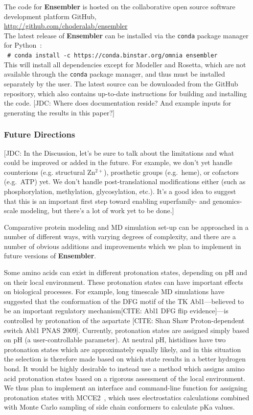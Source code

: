 \documentclass[aps,pre,twocolumn,nofootinbib,superscriptaddress,linenumbers]{revtex4-1}
\newcommand{\shellcmd}[1]{\\\ \texttt{\scriptsize\# #1}\\}
\begin{document}
The code for {\bf Ensembler} is hosted on the collaborative open source software development platform GitHub,\\
\url{http://github.com/choderalab/ensembler} \\
The latest release of {\bf Ensembler} can be installed via the {\tt conda} package manager for Python~\cite{conda}:
\shellcmd{conda install -c https://conda.binstar.org/omnia ensembler}
This will install all dependencies except for Modeller and Rosetta, which are not available through the {\tt conda} package manager, and thus must be installed separately by the user.
The latest source can be downloaded from the GitHub repository, which also contains up-to-date instructions for building and installing the code.
{\color{red}[JDC: Where does documentation reside?  And example inputs for generating the results in this paper?]}

\subsubsection*{Future Directions}

{\color{red}[JDC: In the Discussion, let's be sure to talk about the limitations and what could be improved or added in the future.  For example, we don't yet handle counterions (e.g. structural Zn$^{2+}$), prosthetic groups (e.g.~heme), or cofactors (e.g.~ATP) yet.  We don't handle post-translational modifications either (such as phosphorylation, methylation, glycosylation, etc.).  It's a good idea to suggest that this is an important first step toward enabling superfamily- and genomics-scale modeling, but there's a lot of work yet to be done.]}

Comparative protein modeling and MD simulation set-up can be approached in a number of different ways, with varying degrees of complexity, and there are a number of obvious additions and improvements which we plan to implement in future versions of {\bf Ensembler}.

Some amino acids can exist in different protonation states, depending on pH and on their local environment.
These protonation states can have important effects on biological processes.
For example, long timescale MD simulations have suggested that the conformation of the DFG motif of the TK Abl1---believed to be an important regulatory mechanism[CITE: Abl1 DFG flip evidence]---is controlled by protonation of the aspartate [CITE: Shan Shaw Proton-dependent switch Abl1 PNAS 2009].
Currently, protonation states are assigned simply based on pH (a user-controllable parameter).
At neutral pH, histidines have two protonation states which are approximately equally likely, and in this situation the selection is therefore made based on which state results in a better hydrogen bond.
It would be highly desirable to instead use a method which assigns amino acid protonation states based on a rigorous assessment of the local environment.
We thus plan to implement an interface and command-line function for assigning protonation states with MCCE2~\cite{mcce2}, which uses electrostatics calculations combined with Monte Carlo sampling of side chain conformers to calculate pKa values.
\end{document}
